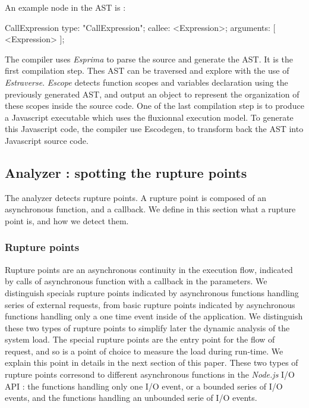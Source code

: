An example node in the AST is :

\begin{code}[Javascript, caption={Example of an AST node},label={lst:astnode}]
CallExpression {
    type: "CallExpression";
    callee: <Expression>;
    arguments: [ <Expression> ];
}
\end{code}

The compiler uses \textit{Esprima} to parse the source and generate the AST.
It is the first compilation step.
Thes AST can be traversed and explore with the use of \textit{Estraverse}.
\textit{Escope} detects function scopes and variables declaration using the previously generated AST, and output an object to represent the organization of these scopes inside the source code.
One of the last compilation step is to produce a Javascript executable which uses the fluxionnal execution model.
To generate this Javascript code, the compiler use Escodegen, to transform back the AST into Javascript source code.

\subsection{Analyzer : spotting the rupture points}

The analyzer detects rupture points.
A rupture point is composed of an asynchronous function, and a callback.
We define in this section what a rupture point is, and how we detect them.

\subsubsection{Rupture points}

Rupture points are an asynchronous continuity in the execution flow, indicated by calls of asynchronous function with a callback in the parameters.
We distinguish specials rupture points indicated by asynchronous functions handling series of external requests, from basic rupture points indicated by asynchronous functions handling only a one time event inside of the application.
We distinguish these two types of rupture points to simplify later the dynamic analysis of the system load.
The special rupture points are the entry point for the flow of request, and so is a point of choice to measure the load during run-time.
We explain this point in details in the next section of this paper. 
These two types of rupture points corresond to different asynchronous functions in the \textit{Node.js} I/O API : the functions handling only one I/O event, or a bounded series of I/O events, and the functions handling an unbounded serie of I/O events.

